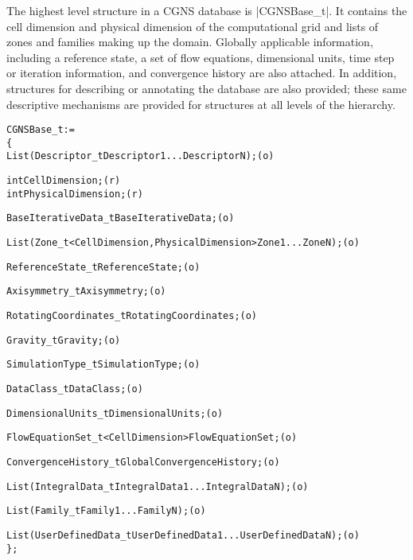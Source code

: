 The highest level structure in a CGNS database is |CGNSBase_t|.
It contains the cell dimension and physical dimension of the
computational grid and lists of zones and families making up the domain.
Globally applicable information, including a reference state, a set of
flow equations, dimensional units, time step or iteration information,
and convergence history are also attached.
In addition, structures for describing or annotating the database are
also provided; these same descriptive mechanisms are provided for
structures at all levels of the hierarchy.
\begin{alltt}
  CGNSBase\_t :=
    \{
    List( Descriptor\_t Descriptor1 ... DescriptorN ) ;                      (o)

    int CellDimension ;                                                     (r)
    int PhysicalDimension ;                                                 (r)

    BaseIterativeData\_t BaseIterativeData ;                                 (o)

    List( Zone\_t<CellDimension, PhysicalDimension> Zone1 ... ZoneN ) ;      (o)

    ReferenceState\_t ReferenceState ;                                       (o)

    Axisymmetry\_t Axisymmetry ;                                             (o)

    RotatingCoordinates\_t RotatingCoordinates ;                             (o)

    Gravity\_t Gravity ;                                                     (o)

    SimulationType\_t SimulationType ;                                       (o)

    DataClass\_t DataClass ;                                                 (o)

    DimensionalUnits\_t DimensionalUnits ;                                   (o)

    FlowEquationSet\_t<CellDimension> FlowEquationSet ;                      (o)

    ConvergenceHistory\_t GlobalConvergenceHistory ;                         (o)

    List( IntegralData\_t IntegralData1... IntegralDataN ) ;                 (o)

    List( Family\_t Family1... FamilyN ) ;                                   (o)

    List( UserDefinedData\_t UserDefinedData1 ... UserDefinedDataN ) ;       (o)
    \} ;
\end{alltt}

